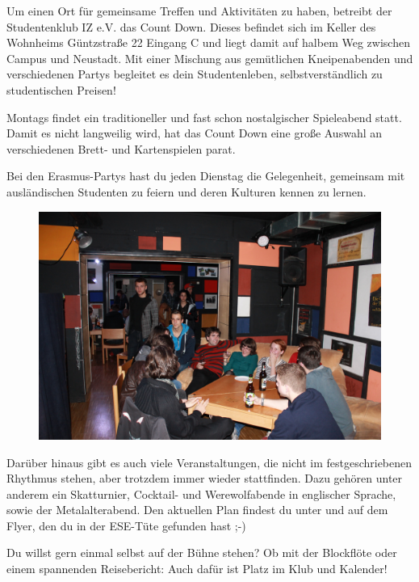 Um einen Ort für gemeinsame Treffen und Aktivitäten zu haben, betreibt der Studentenklub IZ e.V. das Count Down.
Dieses befindet sich im Keller des Wohnheims Güntzstraße 22 Eingang C und liegt damit auf halbem Weg zwischen Campus und Neustadt.
Mit einer Mischung aus gemütlichen Kneipenabenden und verschiedenen Partys begleitet es dein Studentenleben, selbstverständlich zu studentischen Preisen!

Montags findet ein traditioneller und fast schon nostalgischer Spieleabend statt.
Damit es nicht langweilig wird, hat das Count Down eine große Auswahl an verschiedenen Brett- und Kartenspielen parat.

Bei den Erasmus-Partys hast du jeden Dienstag die Gelegenheit, gemeinsam mit ausländischen Studenten zu feiern und deren Kulturen kennen zu lernen.

\begin{figure}%
  \vspace{-.4cm}
  \hspace{.03\linewidth}\includegraphics[width=.96\linewidth]{img/ese2013/cd.jpg}
  \vspace{-.4cm}
\end{figure}

Darüber hinaus gibt es auch viele Veranstaltungen, die nicht im festgeschriebenen Rhythmus stehen, aber trotzdem immer wieder stattfinden.
Dazu gehören unter anderem ein Skatturnier, Cocktail- und Werewolfabende in englischer Sprache, sowie der Metalalterabend.
Den aktuellen Plan findest du unter  und auf dem Flyer, den du in der ESE-Tüte gefunden hast ;-)

Du willst gern einmal selbst auf der Bühne stehen?
Ob mit der Blockflöte oder einem spannenden Reisebericht:
Auch dafür ist Platz im Klub und Kalender!

